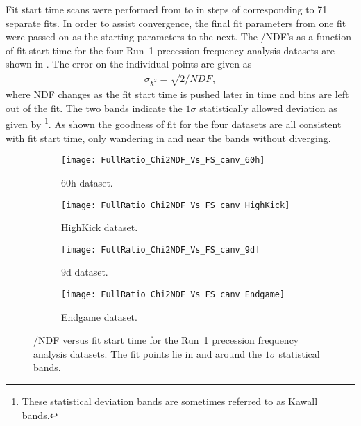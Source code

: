 Fit start time scans were performed from  to  in steps of  corresponding to 71 separate fits. In order to assist convergence, the final fit parameters from one fit were passed on as the starting parameters to the next. The \chisq/NDF's as a function of fit start time for the four Run~1 precession frequency analysis datasets are shown in . The error on the individual points are given as 
  \begin{align}
    \sigma_{\chi^{2}} = \sqrt{2/NDF},
  \end{align}
where NDF changes as the fit start time is pushed later in time and bins are left out of the fit. The two bands indicate the $1\sigma$ statistically allowed deviation as given by \footnote{These statistical deviation bands are sometimes referred to as Kawall bands.}. As shown the goodness of fit for the four datasets are all consistent with fit start time, only wandering in and near the bands without diverging.

\begin{figure}[]
\centering
    \begin{subfigure}[]{0.45\textwidth}
        \centering
        \texttt{[image: FullRatio\_Chi2NDF\_Vs\_FS\_canv\_60h]}
        \caption{60h dataset.}
    \end{subfigure}%
    \begin{subfigure}[]{0.45\textwidth}
        \centering
        \texttt{[image: FullRatio\_Chi2NDF\_Vs\_FS\_canv\_HighKick]}
        \caption{HighKick dataset.}
    \end{subfigure}

    \begin{subfigure}[]{0.45\textwidth}
        \centering
        \texttt{[image: FullRatio\_Chi2NDF\_Vs\_FS\_canv\_9d]}
        \caption{9d dataset.}
    \end{subfigure}%
    \begin{subfigure}[]{0.45\textwidth}
        \centering
        \texttt{[image: FullRatio\_Chi2NDF\_Vs\_FS\_canv\_Endgame]}
        \caption{Endgame dataset.}
    \end{subfigure}
\caption[\chisq/NDF versus fit start time]{\chisq/NDF versus fit start time for the Run~1 precession frequency analysis datasets. The fit points lie in and around the $1\sigma$ statistical bands.}
\label{fig:fitStartTime_chi2}
\end{figure}


